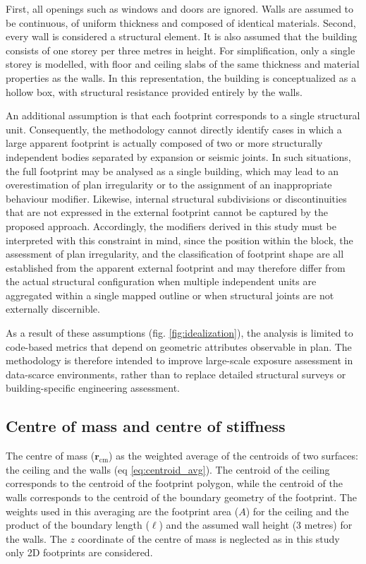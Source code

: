 \begin{refsection}
First, all openings such as windows and doors are ignored. Walls are assumed to be continuous, of uniform thickness and composed of identical materials. Second, every wall is considered a structural element. It is also assumed that the building consists of one storey per three metres in height. For simplification, only a single storey is modelled, with floor and ceiling slabs of the same thickness and material properties as the walls. In this representation, the building is conceptualized as a hollow box, with structural resistance provided entirely by the walls.

An additional assumption is that each footprint corresponds to a single structural unit. Consequently, the methodology cannot directly identify cases in which a large apparent footprint is actually composed of two or more structurally independent bodies separated by expansion or seismic joints. In such situations, the full footprint may be analysed as a single building, which may lead to an overestimation of plan irregularity or to the assignment of an inappropriate behaviour modifier. Likewise, internal structural subdivisions or discontinuities that are not expressed in the external footprint cannot be captured by the proposed approach. Accordingly, the modifiers derived in this study must be interpreted with this constraint in mind, since the position within the block, the assessment of plan irregularity, and the classification of footprint shape are all established from the apparent external footprint and may therefore differ from the actual structural configuration when multiple independent units are aggregated within a single mapped outline or when structural joints are not externally discernible.

As a result of these assumptions (fig. \ref{fig:idealization}), the analysis is limited to code-based metrics that depend on geometric attributes observable in plan. The methodology is therefore intended to improve large-scale exposure assessment in data-scarce environments, rather than to replace detailed structural surveys or building-specific engineering assessment.



\subsection{Centre of mass and centre of stiffness}

The centre of mass ($\mathbf{r}_{\text{cm}}$) as the weighted average of the centroids of two surfaces: the ceiling and the walls (eq \ref{eq:centroid_avg}). The centroid of the ceiling corresponds to the centroid of the footprint polygon, while the centroid of the walls corresponds to the centroid of the boundary geometry of the footprint. The weights used in this averaging are the footprint area ($A$) for the ceiling and the product of the boundary length ($\ell$) and the assumed wall height (3 metres) for the walls. The $z$ coordinate of the centre of mass is neglected as in this study only 2D footprints are considered.


\end{refsection}
